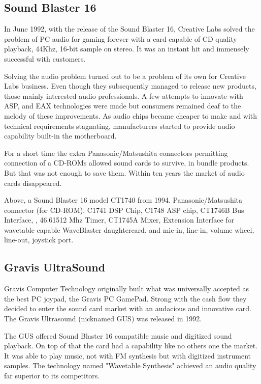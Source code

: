 \subsection{Sound Blaster 16}
 In June 1992, with the release of the Sound Blaster 16, Creative Labs solved the problem of PC audio for gaming forever with a card capable of CD quality playback, 44Khz, 16-bit sample on stereo. It was an instant hit and immensely successful with customers.\\
\par
{}
\par
Solving the audio problem turned out to be a problem of its own for Creative Labs business. Even though they subsequently managed to release new products, those mainly interested audio professionals. A few attempts to innovate with ASP, and EAX technologies were made but consumers remained deaf to the melody of these improvements. As audio chips became cheaper to make and with technical requirements stagnating, manufacturers started to provide audio capability built-in the motherboard.\\
\par
For a short time the extra Panasonic/Matsushita connectors permitting connection of a CD-ROMs allowed sound cards to survive, in bundle products. But that was not enough to save them. Within ten years the market of audio cards disappeared.\\
\par
{}
\par
Above, a Sound Blaster 16 model CT1740 from 1994.  Panasonic/Matsushita connector (for CD-ROM),  C1741 DSP Chip,  C1748 ASP chip,  CT1746B Bus Interface, , 46.61512 Mhz Timer,  CT1745A Mixer,  Extension Interface for wavetable capable WaveBlaster daughtercard, and  mic-in, line-in, volume wheel, line-out, joystick port.







\subsection{Gravis UltraSound}
Gravis Computer Technology originally built what was universally accepted as the best PC joypad, the Gravis PC GamePad. Strong with the cash flow they decided to enter the sound card market with an audacious and innovative card. The Gravis Ultrasound (nicknamed GUS) was released in 1992.\\
\par
The GUS offered Sound Blaster 16 compatible music and digitized sound playback. On top of that the card had a capability like no others one the market. It was able to play music, not with FM synthesis but with digitized instrument samples. The technology named "Wavetable Synthesis" achieved an audio quality far superior to its competitors.


